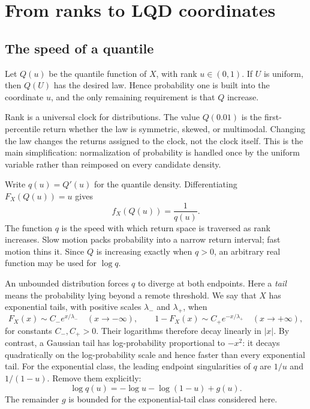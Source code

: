 \section{From ranks to LQD coordinates}
\label{sec:model}

\subsection{The speed of a quantile}

Let $Q(u)$ be the quantile function of $X$, with rank $u\in(0,1)$.  If
$U$ is uniform, then $Q(U)$ has the desired law.  Hence probability one is
built into the coordinate $u$, and the only remaining requirement is that
$Q$ increase.

Rank is a universal clock for distributions.  The value $Q(0.01)$ is the
first-percentile return whether the law is symmetric, skewed, or multimodal.
Changing the law changes the returns assigned to the clock, not the clock
itself.  This is the main simplification: normalization of probability is
handled once by the uniform variable rather than reimposed on every candidate
density.

Write $q(u)=Q'(u)$ for the quantile density.  Differentiating
$F_X(Q(u))=u$ gives
\begin{equation}
f_X(Q(u))=\frac1{q(u)}.
\label{eq:reciprocal}
\end{equation}
The function $q$ is the speed with which return space is traversed as rank
increases.  Slow motion packs probability into a narrow return interval;
fast motion thins it.  Since $Q$ is increasing exactly when $q>0$, an
arbitrary real function may be used for $\log q$.

An unbounded distribution forces $q$ to diverge at both endpoints.  Here a
\emph{tail} means the probability lying beyond a remote threshold.  We say
that $X$ has exponential tails, with positive scales $\lambda_-$ and
$\lambda_+$, when
\begin{equation}
F_X(x)\sim C_-e^{x/\lambda_-}\quad(x\to-\infty),
\qquad
1-F_X(x)\sim C_+e^{-x/\lambda_+}\quad(x\to+\infty),
\label{eq:taildefinitions}
\end{equation}
for constants $C_-,C_+>0$.  Their logarithms therefore decay linearly in
$|x|$.  By contrast, a Gaussian tail has log-probability proportional to
$-x^2$: it decays quadratically on the log-probability scale and hence faster
than every exponential tail.  For the exponential class, the leading endpoint
singularities of $q$ are $1/u$ and $1/(1-u)$.  Remove them explicitly:
\begin{equation}
\log q(u)=-\log u-\log(1-u)+g(u).
\label{eq:skeleton}
\end{equation}
The remainder $g$ is bounded for the exponential-tail class considered here.


